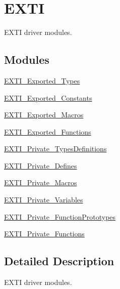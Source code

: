 \hypertarget{group___e_x_t_i}{}\section{E\+X\+TI}
\label{group___e_x_t_i}


E\+X\+TI driver modules.  


\subsection*{Modules}
\begin{DoxyCompactItemize}
\item 
\mbox{\hyperlink{group___e_x_t_i___exported___types}{E\+X\+T\+I\+\_\+\+Exported\+\_\+\+Types}}
\item 
\mbox{\hyperlink{group___e_x_t_i___exported___constants}{E\+X\+T\+I\+\_\+\+Exported\+\_\+\+Constants}}
\item 
\mbox{\hyperlink{group___e_x_t_i___exported___macros}{E\+X\+T\+I\+\_\+\+Exported\+\_\+\+Macros}}
\item 
\mbox{\hyperlink{group___e_x_t_i___exported___functions}{E\+X\+T\+I\+\_\+\+Exported\+\_\+\+Functions}}
\item 
\mbox{\hyperlink{group___e_x_t_i___private___types_definitions}{E\+X\+T\+I\+\_\+\+Private\+\_\+\+Types\+Definitions}}
\item 
\mbox{\hyperlink{group___e_x_t_i___private___defines}{E\+X\+T\+I\+\_\+\+Private\+\_\+\+Defines}}
\item 
\mbox{\hyperlink{group___e_x_t_i___private___macros}{E\+X\+T\+I\+\_\+\+Private\+\_\+\+Macros}}
\item 
\mbox{\hyperlink{group___e_x_t_i___private___variables}{E\+X\+T\+I\+\_\+\+Private\+\_\+\+Variables}}
\item 
\mbox{\hyperlink{group___e_x_t_i___private___function_prototypes}{E\+X\+T\+I\+\_\+\+Private\+\_\+\+Function\+Prototypes}}
\item 
\mbox{\hyperlink{group___e_x_t_i___private___functions}{E\+X\+T\+I\+\_\+\+Private\+\_\+\+Functions}}
\end{DoxyCompactItemize}


\subsection{Detailed Description}
E\+X\+TI driver modules. 

